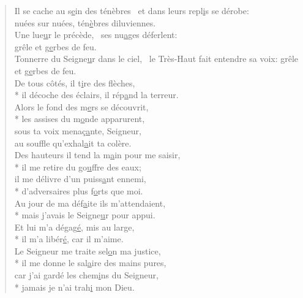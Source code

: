 \begin{verse}
Il se cache au s\underline{e}in des ténèbres~\psalmdagger
et dans leurs repl\underline{i}s se dérobe: \\
nuées sur nuées, tén\underline{è}bres diluviennes. \\

Une lue\underline{u}r le précède,~\psalmdagger
ses nu\underline{a}ges déferlent: \\
grêle et g\underline{e}rbes de feu. \\

Tonnerre du Seigne\underline{u}r dans le ciel,~\psalmstar
le Très-Haut fait entendre sa voix:
grêle et g\underline{e}rbes de feu. \\
De tous côtés, il t\underline{i}re des flèches, \\*
il décoche des éclairs, il rép\underline{a}nd la terreur. \\

Alors le fond des m\underline{e}rs se découvrit, \\*
les assises du m\underline{o}nde apparurent, \\
sous ta voix menaç\underline{a}nte, Seigneur, \\
au souffle qu’exhal\underline{a}it ta colère. \\

Des hauteurs il tend la m\underline{a}in pour me saisir, \\*
il me retire du go\underline{u}ffre des eaux; \\
il me délivre d’un puiss\underline{a}nt ennemi, \\*
d’adversaires plus f\underline{o}rts que moi. \\

Au jour de ma déf\underline{a}ite ils m’attendaient, \\*
mais j’avais le Seigne\underline{u}r pour appui. \\
Et lui m’a dégag\underline{é}, mis au large, \\*
il m’a libér\underline{é}, car il m’aime. \\

Le Seigneur me traite sel\underline{o}n ma justice, \\*
il me donne le sal\underline{a}ire des mains pures, \\
car j’ai gardé les chem\underline{i}ns du Seigneur, \\*
jamais je n’ai trah\underline{i} mon Dieu. \\


\end{verse}

